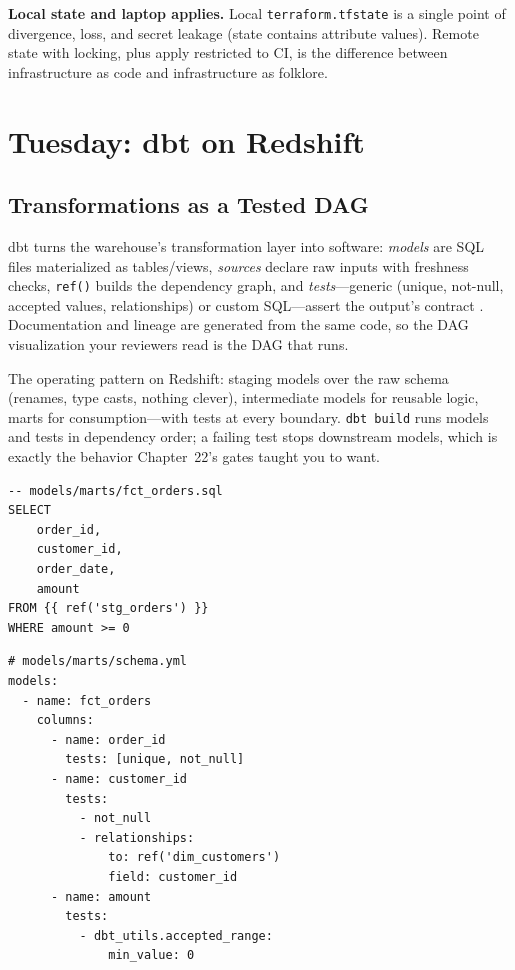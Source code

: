 \begin{pitfall}
\textbf{Local state and laptop applies.} Local \texttt{terraform.tfstate} is a single point of divergence, loss, and secret leakage (state contains attribute values). Remote state with locking, plus apply restricted to CI, is the difference between infrastructure as code and infrastructure as folklore.
\end{pitfall}

\section{Tuesday: dbt on Redshift}
\subsection{Transformations as a Tested DAG}
dbt turns the warehouse's transformation layer into software: \emph{models} are SQL files materialized as tables/views, \emph{sources} declare raw inputs with freshness checks, \texttt{ref()} builds the dependency graph, and \emph{tests}---generic (unique, not-null, accepted values, relationships) or custom SQL---assert the output's contract \cite{dbtCore}. Documentation and lineage are generated from the same code, so the DAG visualization your reviewers read is the DAG that runs.

The operating pattern on Redshift: staging models over the raw schema (renames, type casts, nothing clever), intermediate models for reusable logic, marts for consumption---with tests at every boundary. \texttt{dbt build} runs models and tests in dependency order; a failing test stops downstream models, which is exactly the behavior Chapter~22's gates taught you to want.

\begin{lstlisting}[caption={A dbt model with tests, in the house style.},label={lst:ch24-dbt}]
-- models/marts/fct_orders.sql
SELECT
    order_id,
    customer_id,
    order_date,
    amount
FROM {{ ref('stg_orders') }}
WHERE amount >= 0
\end{lstlisting}

\begin{lstlisting}[caption={Schema tests beside the model.},label={lst:ch24-dbt-tests}]
# models/marts/schema.yml
models:
  - name: fct_orders
    columns:
      - name: order_id
        tests: [unique, not_null]
      - name: customer_id
        tests:
          - not_null
          - relationships:
              to: ref('dim_customers')
              field: customer_id
      - name: amount
        tests:
          - dbt_utils.accepted_range:
              min_value: 0
\end{lstlisting}

